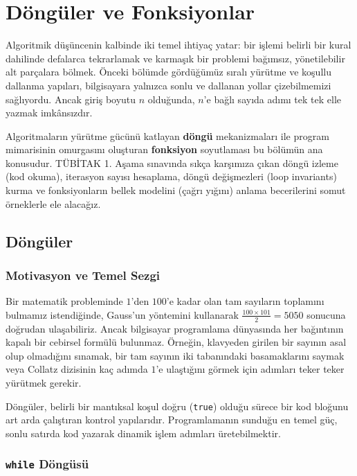 \chapter[Döngüler ve Fonksiyonlar · \textit{Temel}]{Döngüler ve Fonksiyonlar}

Algoritmik düşüncenin kalbinde iki temel ihtiyaç yatar: bir işlemi belirli bir kural dahilinde defalarca tekrarlamak ve karmaşık bir problemi bağımsız, yönetilebilir alt parçalara bölmek. Önceki bölümde gördüğümüz sıralı yürütme ve koşullu dallanma yapıları, bilgisayara yalnızca sonlu ve dallanan yollar çizebilmemizi sağlıyordu. Ancak giriş boyutu $n$ olduğunda, $n$'e bağlı sayıda adımı tek tek elle yazmak imkânsızdır. 

Algoritmaların yürütme gücünü katlayan \textbf{döngü} mekanizmaları ile program mimarisinin omurgasını oluşturan \textbf{fonksiyon} soyutlaması bu bölümün ana konusudur. TÜBİTAK 1. Aşama sınavında sıkça karşımıza çıkan döngü izleme (kod okuma), iterasyon sayısı hesaplama, döngü değişmezleri (loop invariants) kurma ve fonksiyonların bellek modelini (çağrı yığını) anlama becerilerini somut örneklerle ele alacağız.

\section{Döngüler}

\subsection{Motivasyon ve Temel Sezgi}

Bir matematik probleminde $1$'den $100$'e kadar olan tam sayıların toplamını bulmamız istendiğinde, Gauss'un yöntemini kullanarak $\frac{100 \times 101}{2} = 5050$ sonucuna doğrudan ulaşabiliriz. Ancak bilgisayar programlama dünyasında her bağıntının kapalı bir cebirsel formülü bulunmaz. Örneğin, klavyeden girilen bir sayının asal olup olmadığını sınamak, bir tam sayının iki tabanındaki basamaklarını saymak veya Collatz dizisinin kaç adımda $1$'e ulaştığını görmek için adımları teker teker yürütmek gerekir.

Döngüler, belirli bir mantıksal koşul doğru (\texttt{true}) olduğu sürece bir kod bloğunu art arda çalıştıran kontrol yapılarıdır. Programlamanın sunduğu en temel güç, sonlu satırda kod yazarak dinamik işlem adımları üretebilmektir.

\subsection{\texttt{while} Döngüsü}

